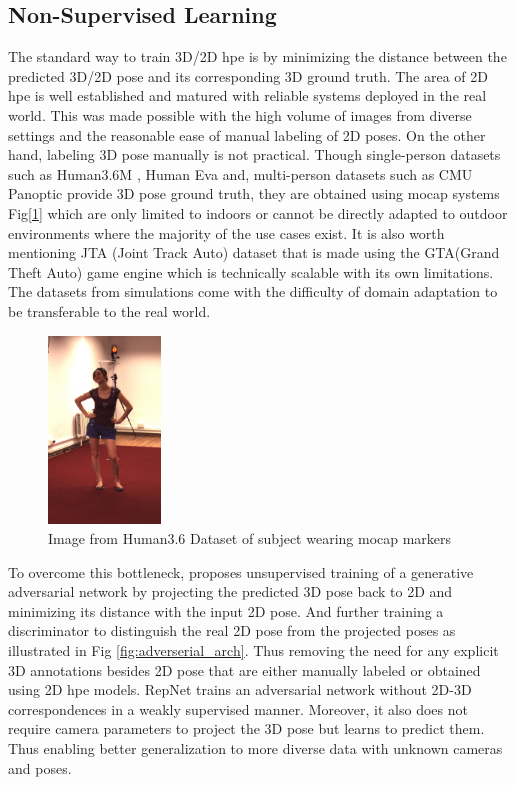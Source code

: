 \subsection{Non-Supervised Learning}
\label{subsec:non_supervised_learning}
The standard way to train 3D/2D \ac{hpe} is by minimizing the distance between the predicted 3D/2D pose and its corresponding 3D ground truth. The area of 2D \ac{hpe} is well established and matured with reliable systems deployed in the real world. This was made possible with the high volume of images from diverse settings and the reasonable ease of manual labeling of 2D poses. On the other hand, labeling 3D pose manually is not practical. Though single-person datasets such as Human3.6M \cite{H3.6}, Human Eva \cite{HumanEva} and, multi-person datasets such as CMU Panoptic \cite{cmuPanoptic} provide 3D pose ground truth, they are obtained using \ac{mocap} systems Fig[\ref{fig:h36_mocap}] which are only limited to indoors or cannot be directly adapted to outdoor environments where the majority of the use cases exist. It is also worth mentioning JTA (Joint Track Auto) dataset \cite{JTA} that is made using the GTA(Grand Theft Auto) game engine which is technically scalable with its own limitations. The datasets from simulations come with the difficulty of domain adaptation to be transferable to the real world.

\begin{figure}[h]
    \centering
    \includegraphics[width=30mm]{figures/h36/h36_mocap.png}
    \caption{Image from Human3.6 Dataset \cite{H3.6} of subject wearing \ac{mocap} markers}
    \label{fig:h36_mocap}
\end{figure}

To overcome this bottleneck, \cite{unsupervisedAdversarial} proposes unsupervised training of a generative adversarial network by projecting the predicted 3D pose back to 2D and minimizing its distance with the input 2D pose. And further training a discriminator to distinguish the real 2D pose from the projected poses as illustrated in Fig \ref{fig:adverserial_arch}. Thus removing the need for any explicit 3D annotations besides 2D pose that are either manually labeled or obtained using 2D \ac{hpe} models. RepNet \cite{repnet} trains an adversarial network without 2D-3D correspondences in a weakly supervised manner. Moreover, it also does not require camera parameters to project the 3D pose but learns to predict them. Thus enabling better generalization to more diverse data with unknown cameras and poses.

